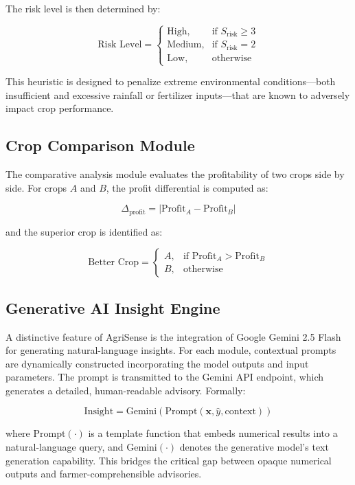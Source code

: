 The risk level is then determined by:

\begin{equation}
\text{Risk Level} = \begin{cases}
\text{High}, & \text{if } S_{\text{risk}} \geq 3 \\
\text{Medium}, & \text{if } S_{\text{risk}} = 2 \\
\text{Low}, & \text{otherwise}
\end{cases}
\end{equation}

This heuristic is designed to penalize extreme environmental conditions---both insufficient and excessive rainfall or fertilizer inputs---that are known to adversely impact crop performance.

\subsection{Crop Comparison Module}
The comparative analysis module evaluates the profitability of two crops side by side. For crops $A$ and $B$, the profit differential is computed as:

\begin{equation}
\Delta_{\text{profit}} = |\text{Profit}_A - \text{Profit}_B|
\end{equation}

and the superior crop is identified as:

\begin{equation}
\text{Better Crop} = \begin{cases}
A, & \text{if } \text{Profit}_A > \text{Profit}_B \\
B, & \text{otherwise}
\end{cases}
\end{equation}

\subsection{Generative AI Insight Engine}
A distinctive feature of AgriSense is the integration of Google Gemini 2.5 Flash \cite{google2024gemini} for generating natural-language insights. For each module, contextual prompts are dynamically constructed incorporating the model outputs and input parameters. The prompt is transmitted to the Gemini API endpoint, which generates a detailed, human-readable advisory. Formally:

\begin{equation}
\text{Insight} = \text{Gemini}(\text{Prompt}(\mathbf{x}, \hat{y}, \text{context}))
\end{equation}

where $\text{Prompt}(\cdot)$ is a template function that embeds numerical results into a natural-language query, and $\text{Gemini}(\cdot)$ denotes the generative model's text generation capability. This bridges the critical gap between opaque numerical outputs and farmer-comprehensible advisories.
